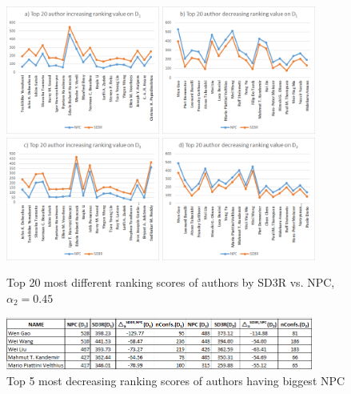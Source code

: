 \documentclass[10pt,leqno,twoside]{article}
\begin{document}
\begin{figure}
	\caption{Top 20 most different ranking scores of authors by SD3R vs. NPC, $\alpha_2=0.45$}
	\label{Fig:Top20AuthorIncDec}
    \centering
    \includegraphics[width=0.45\textwidth]{D1t20aINC}
    \includegraphics[width=0.45\textwidth]{D1t20aDEC}
    \includegraphics[width=0.45\textwidth]{D2t20ainc}
    \includegraphics[width=0.45\textwidth]{D2t20adec}
\end{figure}
%
%
\begin{figure} %
	\caption{Top 5 most decreasing ranking scores of authors having biggest NPC}
	\label{Fig:Top5AuthorDec}
    \centering
    \includegraphics[width=0.9\textwidth]{T5adec}
\end{figure}
\end{document}
